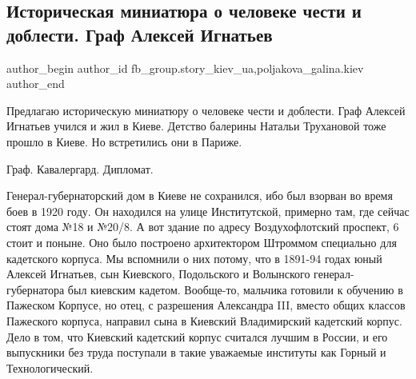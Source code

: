  
 
 
 
 
 
\subsection{Историческая миниатюра о человеке чести и доблести. Граф Алексей Игнатьев}
\label{sec:20_12_2021.fb.fb_group.story_kiev_ua.1.graf_aleksej_ignatjev}
 
\ifcmt
 author_begin
   author_id fb_group.story_kiev_ua,poljakova_galina.kiev
 author_end
\fi

Предлагаю историческую миниатюру о человеке чести и доблести. Граф Алексей
Игнатьев учился и жил в Киеве. Детство балерины Натальи Трухановой тоже прошло
в Киеве. Но встретились они в Париже. 

Граф. Кавалергард.  Дипломат. 




Генерал-губернаторский дом в Киеве не сохранился, ибо был взорван во время боев
в 1920 году. Он находился на улице Институтской, примерно там, где сейчас стоят
дома №18 и №20/8. А вот здание по адресу Воздухофлотский проспект, 6 стоит и
поныне. Оно было построено архитектором Штроммом специально для кадетского
корпуса. Мы вспомнили о них потому, что в 1891-94 годах юный Алексей Игнатьев,
сын Киевского, Подольского и Волынского генерал-губернатора был киевским
кадетом. Вообще-то, мальчика готовили к обучению в Пажеском Корпусе, но отец, с
разрешения Александра III, вместо общих классов Пажеского корпуса, направил
сына в Киевский Владимирский кадетский корпус. Дело в том, что Киевский
кадетский корпус считался лучшим в России, и его выпускники без труда поступали
в такие уважаемые институты как Горный и Технологический. 

